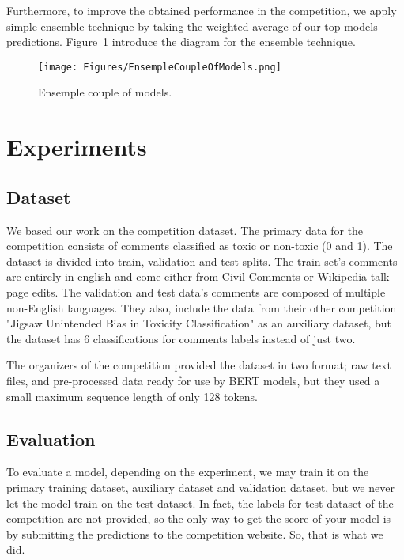 \documentclass[10pt,twocolumn,letterpaper]{article}
\begin{document}
Furthermore, to improve the obtained performance in the competition, we apply simple ensemble technique by taking the weighted average of our top models predictions. Figure~\ref{EnsempleCoupleOfModels} introduce the diagram for the ensemble technique.   

\begin{figure}[htbp]
\centerline{\texttt{[image: Figures/EnsempleCoupleOfModels.png]}}
\caption{Ensemple couple of models.}
\label{EnsempleCoupleOfModels}
\end{figure}


\section{Experiments}

\subsection{Dataset}
We based our work on the competition dataset. The primary data for the competition consists of comments classified as toxic or non-toxic (0 and 1). The dataset is divided into train, validation and test splits. The train set’s comments are entirely in english and come either from Civil Comments or Wikipedia talk page edits. The validation and test data's comments are composed of multiple non-English languages\cite{Jigsaw}. They also, include the data from their other competition "Jigsaw Unintended Bias in Toxicity Classification"\cite{Jigsaw2} as an auxiliary dataset, but the dataset has 6 classifications for comments labels instead of just two.

The organizers of the competition provided the dataset in two format; raw text files, and pre-processed data ready for use by BERT models, but they used a small maximum sequence length of only 128 tokens. 

\subsection{Evaluation}

To evaluate a model, depending on the experiment, we may train it on the primary training dataset, auxiliary dataset and validation dataset, but we never let the model train on the test dataset. In fact, the labels for test dataset of the competition are not provided, so the only way to get the score of your model is by submitting the predictions to the competition website. So, that is what we did.
\end{document}
